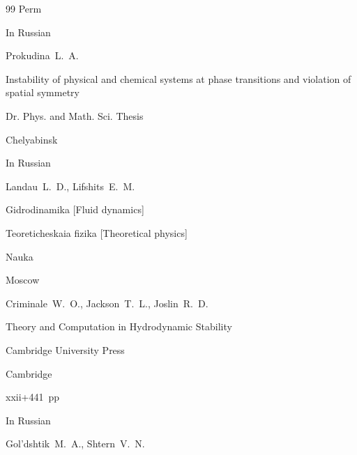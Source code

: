 \begin{thebibliography}{99}
\publaddr Perm











\lang In Russian


\by Prokudina~L.~A.

\thesis Instability of physical and chemical systems at phase transitions and violation of spatial symmetry

\thesisinfo Dr. Phys. and Math. Sci. Thesis

\publaddr Chelyabinsk









\lang In Russian

\by Landau~L.~D., Lifshits~E.~M.

\book Gidrodinamika \rm [Fluid dynamics]

\serial Teoreticheskaia fizika \rm [Theoretical physics]



\publ Nauka

\publaddr Moscow









\by Criminale~W.~O., Jackson~T.~L., Joslin~R.~D.

\book Theory and Computation in Hydrodynamic Stability

\publ Cambridge University Press

\publaddr Cambridge 


\totalpages xxii+441~pp \nofrills







\lang In Russian

\by Gol'dshtik~M.~A., Shtern~V.~N.


\end{thebibliography}
